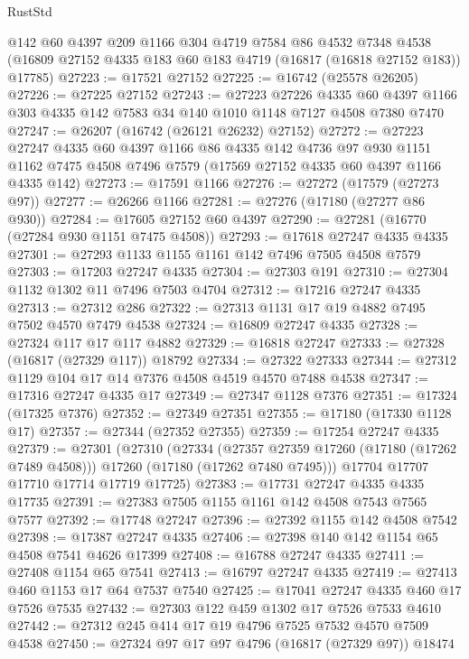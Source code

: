 \begin{lexlean}{RustStd}
\begin{coremodule}
    @142
    @60
    @4397
    @209
    @1166
    @304
    @4719
    @7584
    @86
    @4532
    @7348
    @4538
    (@16809 @27152 @4335 @183 @60 @183 @4719 (@16817 (@16818 @27152 @183)) @17785)
@27223 := @17521 @27152
@27225 := @16742 (@25578 @26205)
@27226 := @27225 @27152
@27243 := @27223
    @27226
    @4335
    @60
    @4397
    @1166
    @303
    @4335
    @142
    @7583
    @34
    @140
    @1010
    @1148
    @7127
    @4508
    @7380
    @7470
@27247 := @26207 (@16742 (@26121 @26232) @27152)
@27272 := @27223
    @27247
    @4335
    @60
    @4397
    @1166
    @86
    @4335
    @142
    @4736
    @97
    @930
    @1151
    @1162
    @7475
    @4508
    @7496
    @7579
    (@17569 @27152 @4335 @60 @4397 @1166 @4335 @142)
@27273 := @17591 @1166
@27276 := @27272 (@17579 (@27273 @97))
@27277 := @26266 @1166
@27281 := @27276 (@17180 (@27277 @86 @930))
@27284 := @17605 @27152 @60 @4397
@27290 := @27281 (@16770 (@27284 @930 @1151 @7475 @4508))
@27293 := @17618 @27247 @4335 @4335
@27301 := @27293 @1133 @1155 @1161 @142 @7496 @7505 @4508 @7579
@27303 := @17203 @27247 @4335
@27304 := @27303 @191
@27310 := @27304 @1132 @1302 @11 @7496 @7503 @4704
@27312 := @17216 @27247 @4335
@27313 := @27312 @286
@27322 := @27313 @1131 @17 @19 @4882 @7495 @7502 @4570 @7479 @4538
@27324 := @16809 @27247 @4335
@27328 := @27324 @117 @17 @117 @4882
@27329 := @16818 @27247
@27333 := @27328 (@16817 (@27329 @117)) @18792
@27334 := @27322 @27333
@27344 := @27312 @1129 @104 @17 @14 @7376 @4508 @4519 @4570 @7488 @4538
@27347 := @17316 @27247 @4335 @17
@27349 := @27347 @1128 @7376
@27351 := @17324 (@17325 @7376)
@27352 := @27349 @27351
@27355 := @17180 (@17330 @1128 @17)
@27357 := @27344 (@27352 @27355)
@27359 := @17254 @27247 @4335
@27379 := @27301
    (@27310
      (@27334
        (@27357 @27359 @17260 (@17180 (@17262 @7489 @4508)))
        @17260
        (@17180 (@17262 @7480 @7495)))
      @17704
      @17707
      @17710
      @17714
      @17719
      @17725)
@27383 := @17731 @27247 @4335 @4335 @17735
@27391 := @27383 @7505 @1155 @1161 @142 @4508 @7543 @7565 @7577
@27392 := @17748 @27247
@27396 := @27392 @1155 @142 @4508 @7542
@27398 := @17387 @27247 @4335
@27406 := @27398 @140 @142 @1154 @65 @4508 @7541 @4626 @17399
@27408 := @16788 @27247 @4335
@27411 := @27408 @1154 @65 @7541
@27413 := @16797 @27247 @4335
@27419 := @27413 @460 @1153 @17 @64 @7537 @7540
@27425 := @17041 @27247 @4335 @460 @17 @7526 @7535
@27432 := @27303 @122 @459 @1302 @17 @7526 @7533 @4610
@27442 := @27312 @245 @414 @17 @19 @4796 @7525 @7532 @4570 @7509 @4538
@27450 := @27324 @97 @17 @97 @4796 (@16817 (@27329 @97)) @18474

\end{coremodule}
\end{lexlean}
